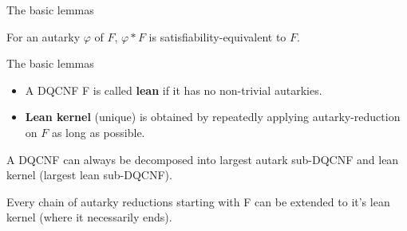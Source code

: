 \documentclass[xcolor=table	]{beamer}
\begin{document}
\begin{frame}{The basic lemmas}
 \begin{lemma}
  For an autarky $\varphi$ of $F$, $\varphi \ast F$ is satisfiability-equivalent to $F$.
 \end{lemma}
{}
\end{frame}

\begin{frame}{The basic lemmas}
 \begin{itemize}
 \item A DQCNF F is called \textbf{lean} if it has no non-trivial autarkies. \newline
 	\pause 
 	
 \item	\textbf{Lean kernel} (unique) is obtained by repeatedly applying autarky-reduction on $F$ as long as possible. \newline
 \end{itemize}
  
 \pause 
  \begin{lemma}
  	A DQCNF can always be decomposed into largest
  	autark sub-DQCNF \newline and lean kernel (largest lean sub-DQCNF). \newline
  	
 	Every chain of autarky reductions starting
 	with F can be extended \newline to it's lean kernel (where
 	it necessarily ends).
 \end{lemma}
\vspace{0.5cm}
 
\end{frame}
\end{document}
